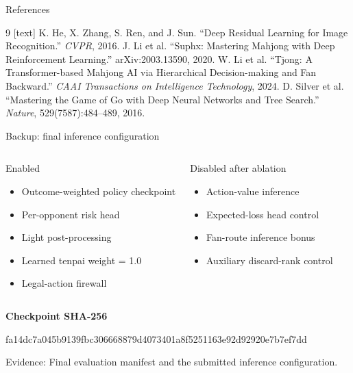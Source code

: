 \documentclass[aspectratio=169,10pt]{beamer}
\newif\ifnobackup
\newcommand{\source}[1]{%
  \vfill
  \ifnobackup\else
    {\fontsize{6.8}{8}\selectfont\color{Muted}Evidence: #1\par}
  \fi
}
\begin{document}
\begin{frame}{References}
  \small
  \begin{thebibliography}{9}
    [text]
      K. He, X. Zhang, S. Ren, and J. Sun.
      ``Deep Residual Learning for Image Recognition.''
      \emph{CVPR}, 2016.
      J. Li et al.
      ``Suphx: Mastering Mahjong with Deep Reinforcement Learning.''
      arXiv:2003.13590, 2020.
      W. Li et al.
      ``Tjong: A Transformer-based Mahjong AI via Hierarchical
      Decision-making and Fan Backward.''
      \emph{CAAI Transactions on Intelligence Technology}, 2024.
      D. Silver et al.
      ``Mastering the Game of Go with Deep Neural Networks and Tree Search.''
      \emph{Nature}, 529(7587):484--489, 2016.
  \end{thebibliography}
\end{frame}

\ifnobackup\else
\appendix

\begin{frame}{Backup: final inference configuration}
  \vspace{0.08cm}
  \begin{columns}[T,onlytextwidth]
      \begin{block}{Enabled}
        \begin{itemize}
          \item Outcome-weighted policy checkpoint
          \item Per-opponent risk head
          \item Light post-processing
          \item Learned tenpai weight = 1.0
          \item Legal-action firewall
        \end{itemize}
      \end{block}
      \begin{exampleblock}{Disabled after ablation}
        \begin{itemize}
          \item Action-value inference
          \item Expected-loss head control
          \item Fan-route inference bonus
          \item Auxiliary discard-rank control
        \end{itemize}
      \end{exampleblock}
  \end{columns}
  \vspace{0.30cm}
  \textbf{Checkpoint SHA-256}\par
  \vspace{0.08cm}
  {\fontsize{7.8}{9.5}\selectfont\ttfamily
   fa14dc7a045b9139fbc306668879d4073401a8f5251163e92d92920e7b7ef7dd}
  \source{Final evaluation manifest and the submitted inference configuration.}
\end{frame}
\end{document}

